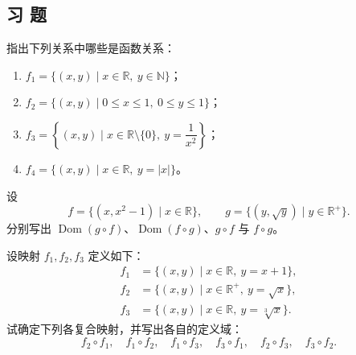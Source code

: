 \subsection{习 题}


\begin{exercise}
  \item 指出下列关系中哪些是函数关系：
  \begin{enumerate}[label=\arabic*)]
    \item \(f_1=\{(x,y)\mid x\in\mathbb{R},\ y\in\mathbb{N}\}\)；
    \item \(f_2=\{(x,y)\mid 0\le x\le 1,\ 0\le y\le 1\}\)；
    \item \(f_3=\left\{(x,y)\mid x\in\mathbb{R}\setminus\{0\},\ y=\dfrac{1}{x^2}\right\}\)；
    \item \(f_4=\{(x,y)\mid x\in\mathbb{R},\ y=|x|\}\)。
  \end{enumerate}
\end{exercise}

\begin{exercise}
  \item 设
  \[
  f=\{(x,x^2-1)\mid x\in\mathbb{R}\},\qquad
  g=\{(y,\sqrt{y})\mid y\in\mathbb{R}^{+}\}.
  \]
  分别写出 \(\operatorname{Dom}(g\circ f)\)、\(\operatorname{Dom}(f\circ g)\)、\(g\circ f\) 与 \(f\circ g\)。
\end{exercise}

\begin{exercise}
  \item 设映射 \(f_1,f_2,f_3\) 定义如下：
  \begin{align*}
    f_1&=\{(x,y)\mid x\in\mathbb{R},\ y=x+1\},\\
    f_2&=\{(x,y)\mid x\in\mathbb{R}^{+},\ y=\sqrt{x}\},\\
    f_3&=\{(x,y)\mid x\in\mathbb{R},\ y=\sqrt[3]{x}\}.
  \end{align*}
  试确定下列各复合映射，并写出各自的定义域：
  \[
  f_2\circ f_1,\quad f_1\circ f_2,\quad
  f_1\circ f_3,\quad f_3\circ f_1,\quad
  f_2\circ f_3,\quad f_3\circ f_2.
  \]
\end{exercise}

